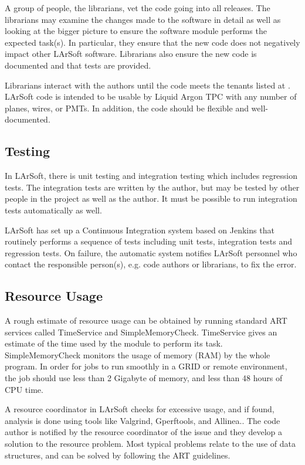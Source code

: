 \documentclass[12pt]{elsarticle}
\begin{document}
A group of people, the librarians, vet the code going into all releases. The librarians may examine the changes made to the software in detail as well as looking at the bigger picture to ensure the software module performs the expected task(s). In particular, they ensure that the new code does not negatively impact other LArSoft software. Librarians also ensure the new code is documented and that tests are provided.

Librarians interact with the authors until the code meets the tenants listed at \cite{code-tenants}. LArSoft code is intended to be usable by Liquid Argon TPC with any number of planes, wires, or PMTs. In addition, the code should be flexible and well-documented. 

\subsection{Testing}

In LArSoft, there is unit testing and integration testing which includes regression tests. The integration tests are written by the author, but may be tested by other people in the project as well as the author. It must be possible to run integration tests automatically as well.

LArSoft has set up a Continuous Integration system based on Jenkins\cite{jenkins} that routinely performs a sequence of tests including unit tests, integration tests and regression tests. On failure, the automatic system notifies LArSoft personnel who contact the responsible person(s), e.g. code authors or librarians, to fix the error.

\subsection{Resource Usage}

A rough estimate of resource usage can be obtained by running standard ART services called TimeService and SimpleMemoryCheck. TimeService gives an estimate of the time used by the module to perform its task. SimpleMemoryCheck monitors the usage of memory (RAM) by the whole program. In order for jobs to run smoothly in a GRID or remote environment, the job should use less than 2 Gigabyte of memory, and less than 48 hours of CPU time.

A resource coordinator in LArSoft cheeks for excessive usage, and if found, analysis is done using tools like Valgrind\cite{valgrind}, Gperftools\cite{gperf}, and Allinea.\cite {allinea}.
The code author is notified by the resource coordinator of the issue and they develop a solution to the resource problem. Most typical problems relate to the use of data structures, and can be solved by following the ART guidelines.\cite{art-guide}
 
\end{document}
